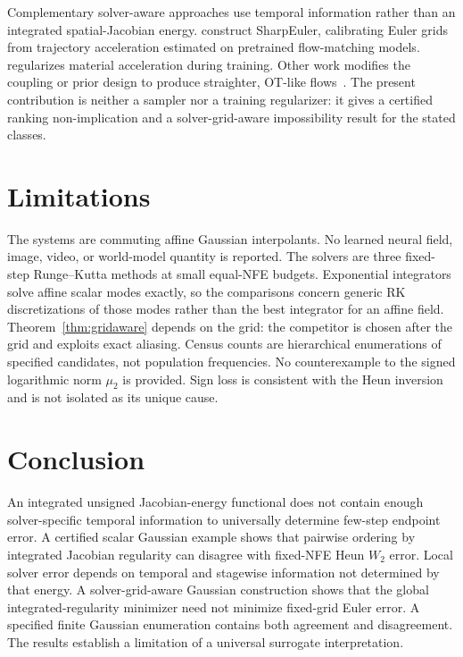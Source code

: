 \documentclass[11pt,a4paper]{article}
\theoremstyle{remark}
\newcommand{\wtwo}{W_2}
\begin{document}
Complementary solver-aware approaches use temporal information rather
than an integrated spatial-Jacobian energy.
\citet{gupta2026sharpen} construct SharpEuler, calibrating Euler grids
from trajectory acceleration estimated on pretrained flow-matching
models. \citet{khan2026isofm} regularizes material acceleration during
training. Other work modifies the coupling or prior design to produce
straighter, OT-like flows~\citep{malnick2026otdesign}. The present
contribution is neither a sampler nor a training regularizer: it gives
a certified ranking non-implication and a solver-grid-aware
impossibility result for the stated classes.

\section{Limitations}
\label{sec:limits}

The systems are commuting affine Gaussian interpolants. No learned neural
field, image, video, or world-model quantity is reported. The solvers are
three fixed-step Runge--Kutta methods at small equal-NFE budgets.
Exponential integrators solve affine scalar modes exactly, so the
comparisons concern generic RK discretizations of those modes rather than
the best integrator for an affine field. Theorem~\ref{thm:gridaware}
depends on the grid: the competitor is chosen after the grid and exploits
exact aliasing. Census counts are hierarchical enumerations of specified
candidates, not population frequencies. No counterexample to the signed
logarithmic norm $\mu_2$ is provided. Sign loss is consistent with the
Heun inversion and is not isolated as its unique cause.

\section{Conclusion}
\label{sec:conclusion}

An integrated unsigned Jacobian-energy functional does not contain enough
solver-specific temporal information to universally determine few-step
endpoint error. A certified scalar Gaussian example shows that pairwise
ordering by integrated Jacobian regularity can disagree with fixed-NFE
Heun $\wtwo$ error. Local solver error depends on temporal and stagewise
information not determined by that energy. A solver-grid-aware Gaussian
construction shows that the global integrated-regularity minimizer need
not minimize fixed-grid Euler error. A specified finite Gaussian
enumeration contains both agreement and disagreement. The results
establish a limitation of a universal surrogate interpretation.
\end{document}
